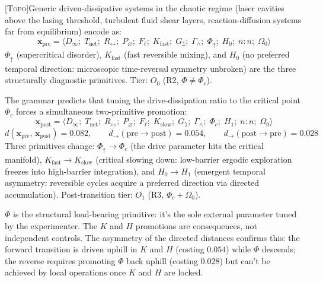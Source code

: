\documentclass[12pt,a4paper]{article}
\newcommand{\Phic}{\Phi_c}
\newcommand{\TOPO}{\textsc{[Topo]}}
\begin{document}
\TOPO\quad Generic driven-dissipative systems in the chaotic regime
(laser cavities above the lasing threshold, turbulent fluid shear layers,
reaction-diffusion systems far from equilibrium) encode as:
\begin{equation}
  \mathbf{x}_\text{pre} =
  \langle D_\infty;\; T_\text{net};\; R_\leftrightarrow;\; P_\varnothing;\;
  F_\ell;\; K_\text{fast};\; G_\gimel;\; \Gamma_\wedge;\; \Phi_\uparrow;\;
  H_0;\; n{:}n;\; \Omega_0 \rangle
  \label{eq:dd_pre}
\end{equation}
$\Phi_\uparrow$ (supercritical disorder), $K_\text{fast}$ (fast reversible
mixing), and $H_0$ (no preferred temporal direction: microscopic
time-reversal symmetry unbroken) are the three structurally diagnostic
primitives. Tier: $O_0$ (R2, $\Phi \neq \Phic$).

The grammar predicts that tuning the drive-dissipation ratio to the
critical point $\Phic$ forces a simultaneous two-primitive promotion:
\begin{equation}
  \mathbf{x}_\text{post} =
  \langle D_\infty;\; T_\text{net};\; R_\leftrightarrow;\; P_\varnothing;\;
  F_\ell;\; K_\text{slow};\; G_\gimel;\; \Gamma_\wedge;\; \Phic;\;
  H_1;\; n{:}n;\; \Omega_0 \rangle
  \label{eq:dd_post}
\end{equation}
\begin{equation}
  d(\mathbf{x}_\text{pre},\, \mathbf{x}_\text{post}) = 0.082, \qquad
  d_\to(\text{pre} \to \text{post}) = 0.054, \qquad
  d_\to(\text{post} \to \text{pre}) = 0.028
  \label{eq:kc_dist}
\end{equation}
Three primitives change: $\Phi_\uparrow \to \Phic$ (the drive parameter
hits the critical manifold), $K_\text{fast} \to K_\text{slow}$
(critical slowing down: low-barrier ergodic exploration freezes into
high-barrier integration), and $H_0 \to H_1$ (emergent temporal
asymmetry: reversible cycles acquire a preferred direction via
directed accumulation). Post-transition tier: $O_1$ (R3, $\Phic +
\Omega_0$).

$\Phi$ is the structural load-bearing primitive: it's the sole
external parameter tuned by the experimenter. The $K$ and $H$
promotions are consequences, not independent controls. The asymmetry
of the directed distances confirms this: the forward transition is
driven uphill in $K$ and $H$ (costing $0.054$) while $\Phi$ descends;
the reverse requires promoting $\Phi$ back uphill (costing $0.028$)
but can't be achieved by local operations once $K$ and $H$ are locked.
\end{document}
